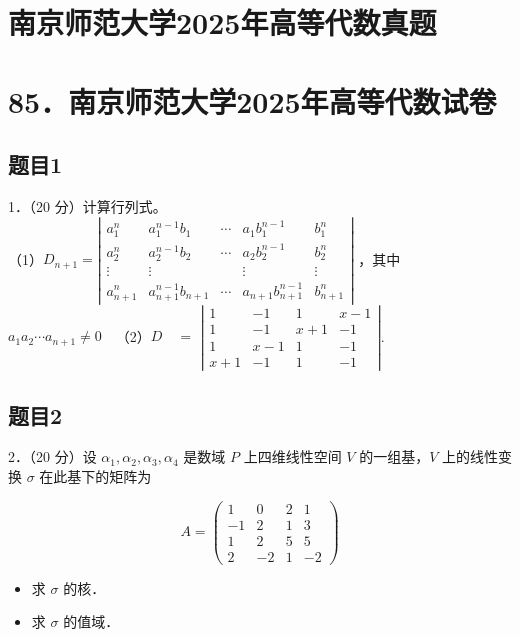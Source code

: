 \documentclass{article}
\begin{document}
\section*{南京师范大学2025年高等代数真题}
\section*{85．南京师范大学2025年高等代数试卷}

\subsection{题目1}
1．（20 分）计算行列式。\\
（1）\(D_{n+1}=\left|\begin{array}{ccccc}a_{1}^{n} & a_{1}^{n-1} b_{1} & \cdots & a_{1} b_{1}^{n-1} & b_{1}^{n} \\ a_{2}^{n} & a_{2}^{n-1} b_{2} & \cdots & a_{2} b_{2}^{n-1} & b_{2}^{n} \\ \vdots & \vdots & & \vdots & \vdots \\ a_{n+1}^{n} & a_{n+1}^{n-1} b_{n+1} & \cdots & a_{n+1} b_{n+1}^{n-1} & b_{n+1}^{n}\end{array}\right|\) ，其中 \(a_{1} a_{2} \cdots a_{n+1} \neq 0 \quad\)（2）\(D \quad=\) \(\left|\begin{array}{cccc}1 & -1 & 1 & x-1 \\ 1 & -1 & x+1 & -1 \\ 1 & x-1 & 1 & -1 \\ x+1 & -1 & 1 & -1\end{array}\right|\).

\subsection{题目2}
2．（20 分）设 \(\alpha_{1}, \alpha_{2}, \alpha_{3}, \alpha_{4}\) 是数域 \(P\) 上四维线性空间 \(V\) 的一组基，\(V\) 上的线性变换 \(\sigma\) 在此基下的矩阵为

\[
A=\left(\begin{array}{cccc}
1 & 0 & 2 & 1 \\
-1 & 2 & 1 & 3 \\
1 & 2 & 5 & 5 \\
2 & -2 & 1 & -2
\end{array}\right)
\]

\begin{itemize}
  \item[（1）] 求 \(\sigma\) 的核．
  \item[（2）] 求 \(\sigma\) 的值域．
\end{itemize}
\end{document}
